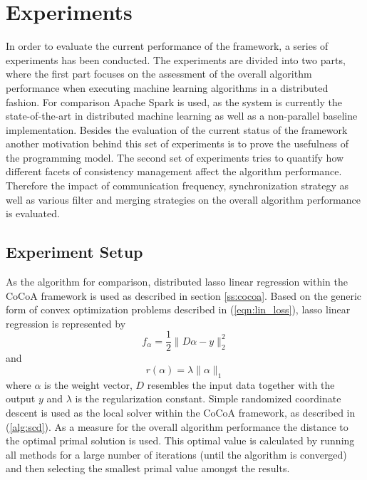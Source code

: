 
\chapter{Experiments}
\label{c:experiments}
In order to evaluate the current performance of the framework, a series of experiments has been conducted.
The experiments are divided into two parts, where the first part focuses on the assessment of the overall algorithm performance when executing machine learning algorithms in a distributed fashion.
For comparison Apache Spark is used, as the system is currently the state-of-the-art in distributed machine learning as well as a non-parallel baseline implementation.
Besides the evaluation of the current status of the framework another motivation behind this set of experiments is to prove the usefulness of the programming model.
The second set of experiments tries to quantify how different facets of consistency management affect the algorithm performance.
Therefore the impact of communication frequency, synchronization strategy as well as various filter and merging strategies on the overall algorithm performance is evaluated.

\section{Experiment Setup}
As the algorithm for comparison, distributed lasso linear regression within the CoCoA framework is used as described in section \ref{ss:cocoa}.
Based on the generic form of convex optimization problems described in (\ref{eqn:lin_loss}), lasso linear regression is represented by
\begin{equation}
f_\alpha = \frac{1}{2} \parallel D\alpha - y \parallel^2_2
\label{eqn:lasso}
\end{equation}
and
\begin{equation}
r(\alpha) = \lambda \parallel \alpha \parallel_1
\label{eqn:lasso_reg}
\end{equation}
where $\alpha$ is the weight vector, $D$ resembles the input data together with the output $y$ and $\lambda$ is the regularization constant.
Simple randomized coordinate descent is used as the local solver within the CoCoA framework, as described in (\ref{alg:scd}).
As a measure for the overall algorithm performance the distance to the optimal primal solution is used. This optimal value is calculated by running all methods for a large number of iterations (until the algorithm is converged) and then selecting the smallest primal value amongst the results.

